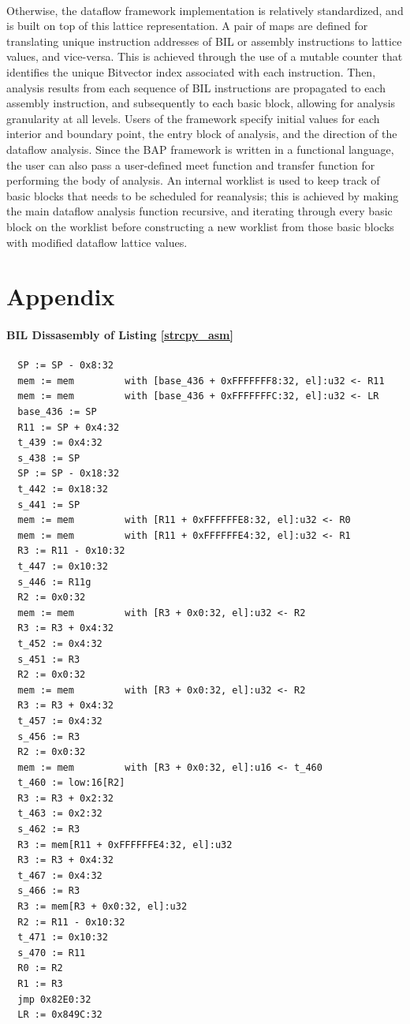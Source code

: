 \documentclass[letterpaper,11pt]{article}
\begin{document}
\paragraph{}
Otherwise, the dataflow framework implementation is relatively standardized,
and is built on top of this lattice representation. A pair of maps are defined
for translating unique instruction addresses of BIL or assembly instructions to
lattice values, and vice-versa. This is achieved through the use of a mutable
counter that identifies the unique Bitvector index associated with each
instruction. Then, analysis results from each sequence of BIL instructions are
propagated to each assembly instruction, and subsequently to each basic block,
allowing for analysis granularity at all levels. Users of the framework specify
initial values for each interior and boundary point, the entry block of
analysis, and the direction of the dataflow analysis. Since the BAP framework
is written in a functional language, the user can also pass a user-defined meet
function and transfer function for performing the body of analysis. An internal
worklist is used to keep track of basic blocks that needs to be scheduled for
reanalysis; this is achieved by making the main dataflow analysis function
recursive, and iterating through every basic block on the worklist before
constructing a new worklist from those basic blocks with modified dataflow
lattice values.

\section{Appendix}
\label{appa2}
\paragraph{BIL Dissasembly of Listing \ref{strcpy_asm}}

\begin{verbatim}
  SP := SP - 0x8:32
  mem := mem         with [base_436 + 0xFFFFFFF8:32, el]:u32 <- R11
  mem := mem         with [base_436 + 0xFFFFFFFC:32, el]:u32 <- LR
  base_436 := SP
  R11 := SP + 0x4:32
  t_439 := 0x4:32
  s_438 := SP
  SP := SP - 0x18:32
  t_442 := 0x18:32
  s_441 := SP
  mem := mem         with [R11 + 0xFFFFFFE8:32, el]:u32 <- R0
  mem := mem         with [R11 + 0xFFFFFFE4:32, el]:u32 <- R1
  R3 := R11 - 0x10:32
  t_447 := 0x10:32
  s_446 := R11g
  R2 := 0x0:32
  mem := mem         with [R3 + 0x0:32, el]:u32 <- R2
  R3 := R3 + 0x4:32
  t_452 := 0x4:32
  s_451 := R3
  R2 := 0x0:32
  mem := mem         with [R3 + 0x0:32, el]:u32 <- R2
  R3 := R3 + 0x4:32
  t_457 := 0x4:32
  s_456 := R3
  R2 := 0x0:32
  mem := mem         with [R3 + 0x0:32, el]:u16 <- t_460
  t_460 := low:16[R2]
  R3 := R3 + 0x2:32
  t_463 := 0x2:32
  s_462 := R3
  R3 := mem[R11 + 0xFFFFFFE4:32, el]:u32
  R3 := R3 + 0x4:32
  t_467 := 0x4:32
  s_466 := R3
  R3 := mem[R3 + 0x0:32, el]:u32
  R2 := R11 - 0x10:32
  t_471 := 0x10:32
  s_470 := R11
  R0 := R2
  R1 := R3
  jmp 0x82E0:32
  LR := 0x849C:32
\end{verbatim}
\end{document}
